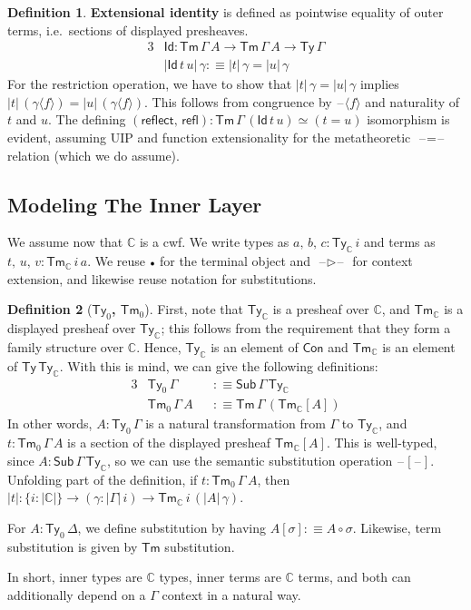 \documentclass[12pt,a4paper,twoside,openany]{book}
\theoremstyle{remark}
\theoremstyle{definition}
\newtheorem{mydefinition}{Definition}
\newcommand{\mbb}[1]{\mathbb{#1}}
\newcommand{\refl}{\mathsf{refl}}
\newcommand{\reflect}{\mathsf{reflect}}
\newcommand{\Con}{\mathsf{Con}}
\newcommand{\Sub}{\mathsf{Sub}}
\newcommand{\Tm}{\mathsf{Tm}}
\newcommand{\Ty}{\mathsf{Ty}}
\newcommand{\Id}{\mathsf{Id}}
\newcommand{\blank}{\mathord{\hspace{1pt}\text{--}\hspace{1pt}}}
\newcommand{\ext}{\triangleright}
\newcommand{\emptycon}{\scaleobj{.75}\bullet}
\newcommand{\mbbC}{\mbb{C}}
\newcommand{\lab}{\langle}
\newcommand{\rab}{\rangle}
\newcommand{\defn}{:\equiv}
\begin{document}
\begin{mydefinition}
\textbf{Extensional identity} is defined as pointwise equality of outer terms,
i.e.\ sections of displayed presheaves.
\begin{alignat*}{3}
  & \Id : \Tm\,\Gamma\,A \to \Tm\,\Gamma\,A \to \Ty\,\Gamma\\
  & |\Id\,t\,u|\,\gamma \defn |t|\,\gamma = |u|\,\gamma
\end{alignat*}
For the restriction operation, we have to show that $|t|\,\gamma = |u|\,\gamma$
implies $|t|\,(\gamma\!\lab\!f\!\rab) = |u|\,(\gamma\!\lab\!f\!\rab)$. This
follows from congruence by $\blank\!\lab\!f\!\rab$ and naturality of $t$ and
$u$.  The defining $(\reflect,\,\refl) : \Tm\,\Gamma\,(\Id\,t\,u) \simeq (t =
u)$ isomorphism is evident, assuming UIP and function extensionality for the
metatheoretic $\blank\!=\!\blank$ relation (which we do assume).
\end{mydefinition}

\subsection{Modeling The Inner Layer}

We assume now that $\mbbC$ is a cwf. We write types as $a,\,b,\,c :
\Ty_\mbbC\,i$ and terms as $t,\,u,\,v : \Tm_\mbbC\,i\,a$. We reuse $\emptycon$
for the terminal object and $\blank\ext\blank$ for context extension, and
likewise reuse notation for substitutions.

\begin{mydefinition}[\textbf{$\Ty_{0}$, $\Tm_{0}$}]
First, note that $\Ty_{\mbbC}$ is a presheaf over $\mbbC$, and $\Tm_{\mbbC}$ is
a displayed presheaf over $\Ty_{\mbbC}$; this follows from the requirement that
they form a family structure over $\mbbC$. Hence, $\Ty_{\mbbC}$ is an element of
$\Con$ and $\Tm_{\mbbC}$ is an element of $\Ty\,\Ty_{\mbbC}$. With this is mind,
we can give the following definitions:
\begin{alignat*}{3}
  & \Ty_{0}\,\Gamma &&\defn \Sub\,\Gamma\,\Ty_{\mbbC}\\
  & \Tm_{0}\,\Gamma\,A &&\defn \Tm\,\Gamma\,(\Tm_\mbbC[A])
\end{alignat*}
In other words, $A : \Ty_{0}\,\Gamma$ is a natural transformation from $\Gamma$
to $\Ty_{\mbbC}$, and $t : \Tm_{0}\,\Gamma\,A$ is a section of the displayed
presheaf $\Tm_\mbbC[A]$. This is well-typed, since $A :
\Sub\,\Gamma\,\Ty_{\mbbC}$, so we can use the semantic substitution operation
$\blank[\blank]$. Unfolding part of the definition, if $t : \Tm_{0}\,\Gamma\,A$,
then $|t| : \{i : |\mbbC|\} \to (\gamma : |\Gamma|\,i) \to
\Tm_{\mbbC}\,i\,(|A|\,\gamma)$.

For $A : \Ty_{0}\,\Delta$, we define substitution by having
$A[\sigma] \defn A \circ \sigma$.  Likewise, term substitution
is given by $\Tm$ substitution.

In short, inner types are $\mbbC$ types, inner terms are $\mbbC$ terms, and
both can additionally depend on a $\Gamma$ context in a natural way.
\end{mydefinition}
\end{document}
